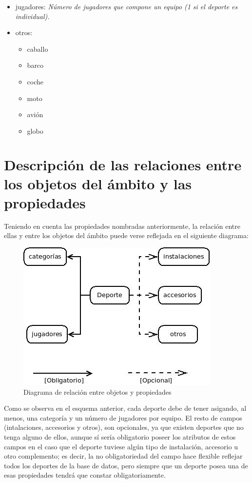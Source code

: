 \begin{itemize}
\item jugadores: \emph{Número de jugadores que compone un equipo (1 si el deporte es individual).}

\item otros:
	\begin{itemize}
	\item caballo
	\item barco
	\item coche
	\item moto
	\item avión
	\item globo
	\end{itemize}
\end{itemize}



\section{Descripción de las relaciones entre los objetos del ámbito y las propiedades}

Teniendo en cuenta las propiedades nombradas anteriormente, la relación entre ellas y entre los objetos del ámbito puede verse reflejada en el siguiente diagrama:

\begin{figure} [ht]
\begin {center}
\includegraphics[scale = 0.6]{./Deportes.jpeg}
\caption{Diagrama de relación entre objetos y propiedades}
\end {center}
\end{figure}

Como se observa en el esquema anterior, cada deporte debe de tener asigando, al menos, una categoría y un número de jugadores por equipo. El resto de campos (intalaciones, accesorios y otros), son opcionales, ya que existen deportes que no tenga alguno de ellos, aunque sí sería obligatorio poseer los atributos de estos campos en el caso que el deporte tuviese algún tipo de instalación, accesorio u otro complemento; es decir, la no obligatoriedad del campo hace flexible reflejar todos los deportes de la base de datos, pero siempre que un deporte posea una de esas propiedades tendrá que constar obligatoriamente.


